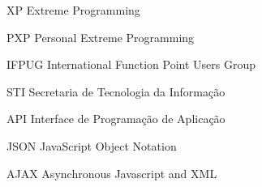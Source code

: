 \begin{siglas}
  \item[XP] Extreme Programming
  \item[PXP] Personal Extreme Programming
  \item[IFPUG] International Function Point Users Group
  \item[STI] Secretaria de Tecnologia da Informação
  \item[API] Interface de Programação de Aplicação
  \item[JSON] JavaScript Object Notation
  \item [AJAX] Asynchronous Javascript and XML
\end{siglas}
